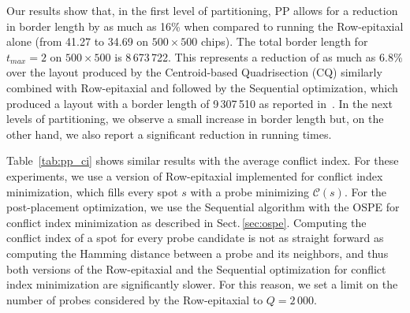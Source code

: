 \documentclass{llncs}
\begin{document}
Our results
show that, in the first level of partitioning, PP allows for a reduction in border length
by as much as 16\% when compared to running the Row-epitaxial alone (from 41.27 to
34.69 on $500\times 500$ chips). The total border length for $t_{max}=2$ on
$500\times 500$ is 8\,673\,722. This represents a reduction of as much as 6.8\% over
the layout produced by the Centroid-based Quadrisection (CQ) similarly combined with
Row-epitaxial and followed by the Sequential optimization, which produced a layout
with a border length of 9\,307\,510 as reported in~\cite{KAHNG03B}. In the next levels
of partitioning, we observe a small increase in border length but, on the other hand,
we also report a significant reduction in running times.

Table~\ref{tab:pp_ci} shows similar results with the average conflict index. For these
experiments, we use a version of Row-epitaxial implemented for conflict index
minimization, which fills every spot $s$ with a probe minimizing $\mathcal{C}(s)$.
For the post-placement optimization,
we use the Sequential algorithm with the OSPE for conflict index minimization
as described in Sect.\,\ref{sec:ospe}. Computing the conflict index of a spot for
every probe candidate is not as straight forward as computing the Hamming distance
between a probe
and its neighbors, and thus both versions of the Row-epitaxial and the Sequential
optimization for conflict index minimization are significantly slower. For this reason,
we set a limit on the number of probes considered by the Row-epitaxial to $Q = 2\,000$.
\end{document}
